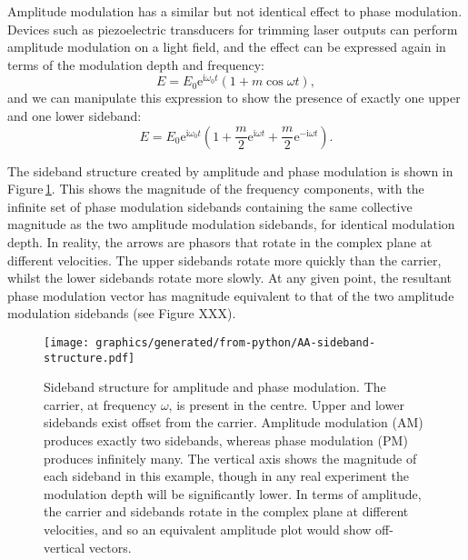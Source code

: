 Amplitude modulation has a similar but not identical effect to phase modulation. Devices such as piezoelectric transducers for trimming laser outputs can perform amplitude modulation on a light field, and the effect can be expressed again in terms of the modulation depth and frequency:
\begin{equation}
  E = E_0 \text{e}^{\text{i} \omega_0 t} \left( 1 + m \cos{\omega t} \right),
\end{equation}
and we can manipulate this expression to show the presence of exactly one upper and one lower sideband:
\begin{equation}
  \label{eq:field-amp-mod}
  E = E_0 \text{e}^{\text{i} \omega_0 t} \left( 1 + \frac{m}{2} \text{e}^{\text{i} \omega t} + \frac{m}{2} \text{e}^{-\text{i} \omega t} \right).
\end{equation}

The sideband structure created by amplitude and phase modulation is shown in Figure\,\ref{fig:sideband-structure}. This shows the magnitude of the frequency components, with the infinite set of phase modulation sidebands containing the same collective magnitude as the two amplitude modulation sidebands, for identical modulation depth. In reality, the arrows are phasors that rotate in the complex plane at different velocities. The upper sidebands rotate more quickly than the carrier, whilst the lower sidebands rotate more slowly. At any given point, the resultant phase modulation vector has magnitude equivalent to that of the two amplitude modulation sidebands (see Figure XXX).

\begin{figure}
  \centering
  \texttt{[image: graphics/generated/from-python/AA-sideband-structure.pdf]}
  \caption{Sideband structure for amplitude and phase modulation. The carrier, at frequency $\omega$, is present in the centre. Upper and lower sidebands exist offset from the carrier. Amplitude modulation (AM) produces exactly two sidebands, whereas phase modulation (PM) produces infinitely many. The vertical axis shows the magnitude of each sideband in this example, though in any real experiment the modulation depth will be significantly lower. In terms of amplitude, the carrier and sidebands rotate in the complex plane at different velocities, and so an equivalent amplitude plot would show off-vertical vectors.}
  \label{fig:sideband-structure}
\end{figure}


